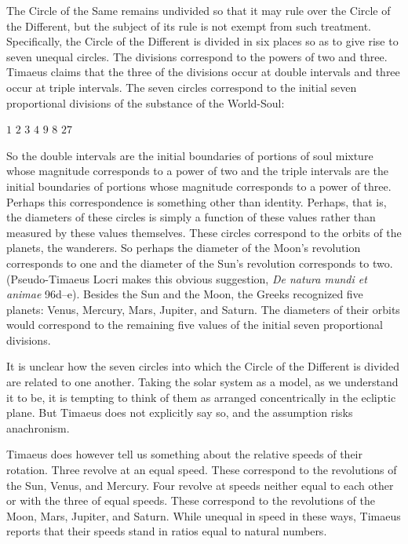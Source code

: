 The Circle of the Same remains undivided so that it may rule over the Circle of the Different, but the subject of its rule is not exempt from such treatment. Specifically, the Circle of the Different is divided in six places so as to give rise to seven unequal circles. The divisions correspond to the powers of two and three. Timaeus claims that the three of the divisions occur at double intervals and three occur at triple intervals. The seven circles correspond to the initial seven proportional divisions of the substance of the World-Soul:
\begin{center}
	\( 1 \) \( 2 \) \( 3 \) \( 4 \) \( 9 \) \( 8 \) \( 27 \)
\end{center}
So the double intervals are the initial boundaries of portions of soul mixture whose magnitude corresponds to a power of two and the triple intervals are the initial boundaries of portions whose magnitude corresponds to a power of three. Perhaps this correspondence is something other than identity. Perhaps, that is, the diameters of these circles is simply a function of these values rather than measured by these values themselves. These circles correspond to the orbits of the planets, the wanderers. So perhaps the diameter of the Moon's revolution corresponds to one and the diameter of the Sun's revolution corresponds to two. (Pseudo-Timaeus Locri makes this obvious suggestion, \emph{De natura mundi et animae} 96d--e). Besides the Sun and the Moon, the Greeks recognized five planets: Venus, Mercury, Mars, Jupiter, and Saturn. The diameters of their orbits would correspond to the remaining five values of the initial seven proportional divisions.

It is unclear how the seven circles into which the Circle of the Different is divided are related to one another. Taking the solar system as a model, as we understand it to be, it is tempting to think of them as arranged concentrically in the ecliptic plane. But Timaeus does not explicitly say so, and the assumption risks anachronism.

Timaeus does however tell us something about the relative speeds of their rotation. Three revolve at an equal speed. These correspond to the revolutions of the Sun, Venus, and Mercury. Four revolve at speeds neither equal to each other or with the three of equal speeds. These correspond to the revolutions of the Moon, Mars, Jupiter, and Saturn. While unequal in speed in these ways, Timaeus reports that their speeds stand in ratios equal to natural numbers.


